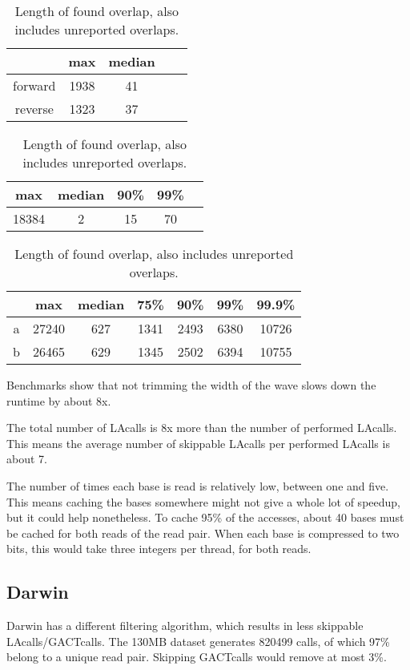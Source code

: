 \documentclass[../thesis.tex]{subfiles}
\begin{document}
\begin{table}[h]
\bigskip
\caption{Max drift ($\mid$initial diagonal - observed diagonal$\mid$)}
\label{tbl:daligner_dist5}
\centering
\vspace{-5pt}
\begin{tabular}{c|c c c c}
& max & median \\ \hline
forward & 1938 & 41 \\
reverse & 1323 & 37 \\
\end{tabular}

\bigskip
\caption{Number of skippable LAcalls per performed LAcall}
\label{tbl:daligner_dist6}
\centering
\vspace{-5pt}
\begin{tabular}{c c c c c}
max & median & 90\% & 99\% \\ \hline
18384 & 2 & 15 & 70 \\
\end{tabular}

\bigskip
\caption{Length of found overlap, also includes unreported overlaps.}
\label{tbl:daligner_dist7}
\centering
\vspace{-5pt}
\begin{tabular}{c|c c c c c c}
& max & median & 75\% & 90\% & 99\% & 99.9\% \\ \hline
a & 27240 & 627 & 1341 & 2493 & 6380 & 10726 \\
b & 26465 & 629 & 1345 & 2502 & 6394 & 10755 \\
\end{tabular}
\end{table}


Benchmarks show that not trimming the width of the wave slows down the runtime by about 8x.

The total number of LAcalls is 8x more than the number of performed LAcalls.
This means the average number of skippable LAcalls per performed LAcalls is about 7.

The number of times each base is read is relatively low, between one and five.
This means caching the bases somewhere might not give a whole lot of speedup, but it could help nonetheless.
To cache 95\% of the accesses, about 40 bases must be cached for both reads of the read pair.
When each base is compressed to two bits, this would take three integers per thread, for both reads.

\subsection{Darwin}
Darwin has a different filtering algorithm, which results in less skippable LAcalls/GACTcalls.
The 130MB dataset generates 820499 calls, of which 97\% belong to a unique read pair.
Skipping GACTcalls would remove at most 3\%.
\end{document}
